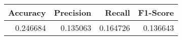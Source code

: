 \begin{tabular}{rrrr}
\toprule
 Accuracy &  Precision &   Recall &  F1-Score \\
\midrule
 0.246684 &   0.135063 & 0.164726 &  0.136643 \\
\bottomrule
\end{tabular}
